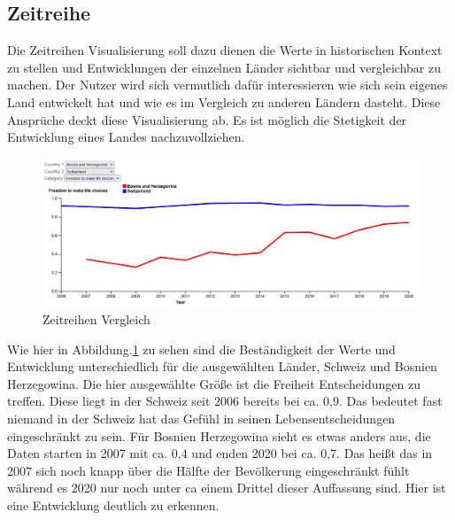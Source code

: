 \subsection{Zeitreihe}

Die Zeitreihen Visualisierung soll dazu dienen die Werte in historischen Kontext zu stellen und Entwicklungen der einzelnen Länder sichtbar und vergleichbar zu machen. Der Nutzer wird sich vermutlich dafür interessieren wie sich sein eigenes Land entwickelt hat und wie es im Vergleich zu anderen Ländern dasteht. Diese Ansprüche deckt diese Visualisierung ab. Es ist möglich die Stetigkeit der Entwicklung eines Landes nachzuvollziehen.\\

\begin{figure}[h]
 \centering
 \includegraphics[width = \textwidth]{img/timeseries_anw.jpg}
 \caption{Zeitreihen Vergleich}
 \label{fig:time_anw}
\end{figure}

Wie hier in Abbildung.\ref{fig:time_anw} zu sehen sind die Beständigkeit der Werte und Entwicklung unterschiedlich für die ausgewählten Länder, Schweiz und Bosnien Herzegowina. Die hier ausgewählte Größe ist die Freiheit Entscheidungen zu treffen. Diese liegt in der Schweiz seit 2006 bereits bei ca. 0,9. Das bedeutet fast niemand in der Schweiz hat das Gefühl in seinen Lebensentscheidungen eingeschränkt zu sein. Für Bosnien Herzegowina sieht es etwas anders aus, die Daten starten in 2007 mit ca. 0,4 und enden 2020 bei ca. 0,7. Das heißt das in 2007 sich noch knapp über die Hälfte der Bevölkerung eingeschränkt fühlt während es 2020 nur noch unter ca einem Drittel dieser Auffassung sind. Hier ist eine Entwicklung deutlich zu erkennen. 